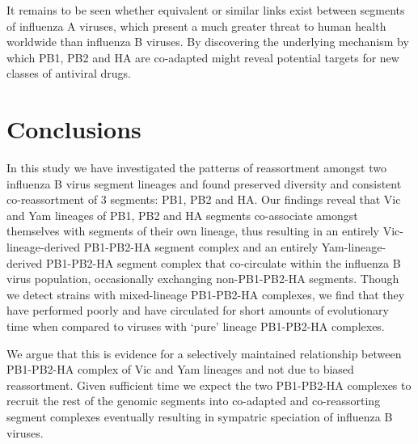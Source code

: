 \documentclass[11pt,oneside,letterpaper]{article}
\begin{document}
It remains to be seen whether equivalent or similar links exist between segments of influenza A viruses, which present a much greater threat to human health worldwide than influenza B viruses.
By discovering the underlying mechanism by which PB1, PB2 and HA are co-adapted might reveal potential targets for new classes of antiviral drugs.

\section*{Conclusions}
In this study we have investigated the patterns of reassortment amongst two influenza B virus segment lineages and found preserved diversity and consistent co-reassortment of 3 segments: PB1, PB2 and HA.
Our findings reveal that Vic and Yam lineages of PB1, PB2 and HA segments co-associate amongst themselves with segments of their own lineage, thus resulting in an entirely Vic-lineage-derived PB1-PB2-HA segment complex and an entirely Yam-lineage-derived PB1-PB2-HA segment complex that co-circulate within the influenza B virus population, occasionally exchanging non-PB1-PB2-HA segments.
Though we detect strains with mixed-lineage PB1-PB2-HA complexes, we find that they have performed poorly and have circulated for short amounts of evolutionary time when compared to viruses with `pure' lineage PB1-PB2-HA complexes.

We argue that this is evidence for a selectively maintained relationship between PB1-PB2-HA complex of Vic and Yam lineages and not due to biased reassortment.
Given sufficient time we expect the two PB1-PB2-HA complexes to recruit the rest of the genomic segments into co-adapted and co-reassorting segment complexes eventually resulting in sympatric speciation of influenza B viruses.






\end{document}
